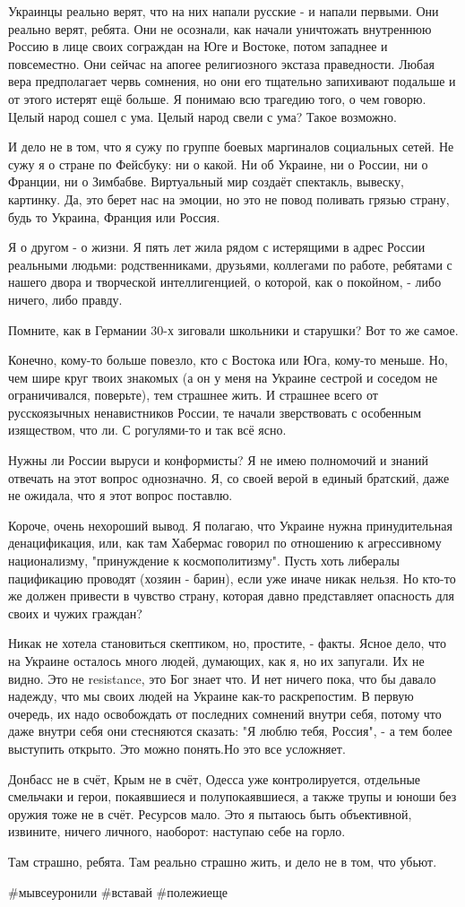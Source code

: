 Украинцы реально верят, что на них напали русские - и напали первыми. Они
реально верят, ребята. Они не осознали, как начали уничтожать внутреннюю Россию
в лице своих сограждан на Юге и Востоке, потом западнее и повсеместно.  Они
сейчас на апогее религиозного экстаза праведности. Любая вера предполагает
червь сомнения, но они его тщательно запихивают подальше и от этого истерят ещё
больше. Я понимаю всю трагедию того, о чем говорю. Целый народ сошел с ума.
Целый народ свели с ума? Такое возможно.

И дело не в том, что я сужу по группе боевых маргиналов социальных сетей. Не
сужу я о стране по Фейсбуку: ни о какой. Ни об Украине, ни о России, ни о
Франции, ни о Зимбабве. Виртуальный мир создаёт спектакль, вывеску, картинку.
Да, это берет нас на эмоции, но это не повод поливать грязью страну, будь то
Украина, Франция или Россия.

Я о другом - о жизни. Я пять лет жила рядом с истерящими в адрес России
реальными людьми: родственниками, друзьями, коллегами по работе, ребятами с
нашего двора и творческой интеллигенцией, о которой, как о покойном, - либо
ничего, либо правду. 

Помните, как в Германии 30-х зиговали школьники и старушки? Вот то же самое.

Конечно, кому-то больше повезло, кто с Востока или Юга, кому-то меньше. Но, чем
шире круг твоих знакомых (а он у меня на Украине сестрой и соседом не
ограничивался, поверьте), тем страшнее жить. И страшнее всего от русскоязычных
ненавистников России, те начали зверствовать с особенным изяществом, что ли. С
рогулями-то и так всё ясно.

Нужны ли России выруси и конформисты? Я не имею полномочий и знаний отвечать на
этот вопрос однозначно. Я, со своей верой в единый братский, даже не ожидала,
что я этот вопрос поставлю. 

Короче, очень нехороший вывод. Я полагаю, что Украине нужна принудительная
денацификация, или, как там Хабермас говорил по отношению к агрессивному
национализму, "принуждение к космополитизму". Пусть хоть либералы пацификацию
проводят (хозяин - барин), если уже иначе никак нельзя. Но кто-то же должен
привести в чувство страну, которая давно представляет опасность для своих и
чужих граждан?

Никак не хотела становиться скептиком, но, простите, - факты. Ясное дело, что
на Украине осталось много людей, думающих, как я, но их запугали. Их не видно.
Это не resistance, это Бог знает что. И нет ничего пока, что бы давало надежду,
что мы своих людей на Украине как-то раскрепостим. В первую очередь, их надо
освобождать от последних сомнений внутри себя, потому что даже внутри себя они
стесняются сказать: "Я люблю тебя, Россия", - а тем более выступить открыто.
Это можно понять.Но это все усложняет.

Донбасс не в счёт, Крым не в счёт, Одесса уже контролируется, отдельные
смельчаки и герои, покаявшиеся и полупокаявшиеся, а также трупы и юноши без
оружия тоже не в счёт. Ресурсов мало. Это я пытаюсь быть объективной, извините,
ничего личного, наоборот: наступаю себе на горло. 

Там страшно, ребята. Там реально страшно жить, и дело не в том, что убьют.

\#мывсеуронили \#вставай \#полежиеще
